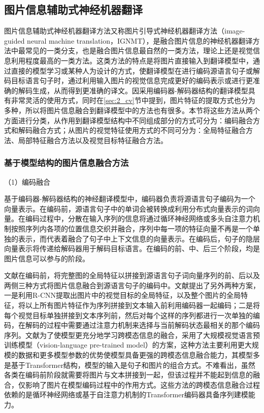 \subsection{图片信息辅助式神经机器翻译}
\label{sec:2_ignmt}

图片信息辅助式神经机器翻译方法又称图片引导式神经机器翻译方法（image-guided neural machine translation，IGNMT），是融合图片信息的神经机器翻译方法中最常见的一类分支，也是融合图片信息最自然的一类方法，理论上还是视觉信息利用程度最高的一类方法。这类方法的特点是将图片直接输入到翻译模型中，通过直接的模型学习或某种人为设计的方式，使翻译模型在进行编码源语言句子或解码目标语言句子时，通过利用输入图片的视觉信息完成更好的编码表示或进行更准确的解码生成，从而得到更准确的译文。因采用编码器-解码器结构的翻译模型具有非常灵活的使用方式，同时在\ref{sec:2_cv}节中提到，图片特征的提取方式也分为多种，所以将图片信息融合到翻译模型中的方法也有很多。本节将这些方法从两个方面进行分类，从作用到翻译模型结构中不同组成部分的方式可分为：编码融合方式和解码融合方式；从图片的视觉特征使用方式的不同可分为：全局特征融合方法、局部特征融合方法以及视觉目标特征融合方法。

\subsubsection{基于模型结构的图片信息融合方法}

{\sffamily （1）编码融合}

基于编码器-解码器结构的神经翻译模型中，编码器负责将源语言句子编码为一个向量表示。在编码前，源语言句子中的单词会被转换成利用分布式向量表示的词向量。在编码过程中，分散在输入序列的信息将通过循环神经网络或多头自注意力机制按照序列内各项的位置信息交织并融合，序列中每一项的特征向量不再是一个单独的表示，而代表着融合了句子中上下文信息的向量表示。在编码后，句子的隐层向量表示将传递给解码器用于解码目标语言。在编码的前、中、后三个阶段，均是图片信息可以参与的阶段。

文献\cite{18_DBLP:conf/emnlp/CalixtoL17}在编码前，将完整图的全局特征以拼接到源语言句子词向量序列的前、后以及两侧三种方式将图片信息融合到源语言句子的编码中。文献\cite{35_huang-etal-2016-attention}提出了另外两种方案，一是利用R-CNN\cite{DBLP:conf/cvpr/GirshickDDM14}提取出图片中的视觉目标的全局特征，以及整个图片的全局特征，将以上所有图片特征作为序列拼接到文本输入前利用编码器一起编码；二是将每个视觉目标单独拼接到文本序列前，然后对每个这样的序列都进行一次单独的编码，在解码的过程中需要通过注意力机制来选择与当前解码状态最相关的那个编码序列。文献\cite{89_DBLP:conf/eacl/CaglayanKAMEES21,90_wang-etal-2021-make,91_susanto-etal-2021-rakutens,92_yawei-fan-2021-probing,93_DBLP:journals/access/HirasawaKIK22}为了使模型更充分地学习跨模态信息的融合，采用了大规模视觉语言预训练模型（vision-language pre-trained model）的方案，这种方法主要利用更大规模的数据和更多模型参数的优势使模型具备更强的跨模态信息融合能力，其模型多是基于Transformer结构，模型的输入是句子和图片的组合方式。不难看出，虽然各类在编码前阶段就需要将图片与文本拼接到一起，但该过程并不能起到信息的融合，仅影响了图片在模型编码过程中的作用方式。这些方法的跨模态信息融合过程依赖的是循环神经网络或基于自注意力机制的Transformer编码器具备序列建模能力。

